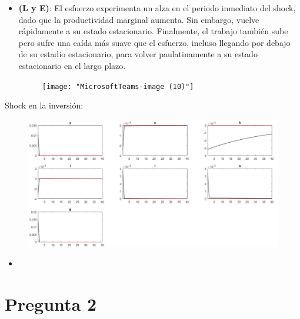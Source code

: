 \documentclass{article}
\begin{document}
\begin{itemize}
\item \textbf{(L y E)}: El esfuerzo experimenta un alza en el periodo inmediato del shock, dado que la productividad marginal aumenta. Sin embargo, vuelve rápidamente a su estado estacionario. Finalmente, el trabajo también sube pero sufre una caída más suave que el esfuerzo, incluso llegando por debajo de su estadio estacionario, para volver paulatinamente a su estado estacionario en el largo plazo.
    
 \begin{figure}[h!]
 	\centering
 	\texttt{[image: "MicrosoftTeams-image (10)"]}
 	\caption{}
 	\label{fig:microsoftteams-image-10}
 \end{figure}
 
\end{itemize}
Shock en la inversión:
\begin{figure}[h!]
	\centering
	\includegraphics[width=1.2\linewidth]{shockinv}
	\label{fig:w3}
\end{figure}
\begin{itemize}
\item  
\end{itemize}

\section{Pregunta 2}
\end{document}
